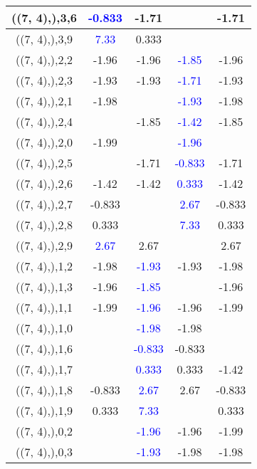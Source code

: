 \documentclass{article}
\begin{document}
\begin{center}
\begin{longtable}{|c|c|c|c|c|}
        	((7, 4),),3,6& \textcolor{blue}{-0.833}&-1.71&&-1.71\\
        	\hline
        	((7, 4),),3,9& \textcolor{blue}{7.33}&0.333&&\\
        	\hline
        	((7, 4),),2,2&-1.96&-1.96& \textcolor{blue}{-1.85}&-1.96\\
        	\hline
        	((7, 4),),2,3&-1.93&-1.93& \textcolor{blue}{-1.71}&-1.93\\
        	\hline
        	((7, 4),),2,1&-1.98&& \textcolor{blue}{-1.93}&-1.98\\
        	\hline
        	((7, 4),),2,4&&-1.85& \textcolor{blue}{-1.42}&-1.85\\
        	\hline
        	((7, 4),),2,0&-1.99&& \textcolor{blue}{-1.96}&\\
        	\hline
        	((7, 4),),2,5&&-1.71& \textcolor{blue}{-0.833}&-1.71\\
        	\hline
        	((7, 4),),2,6&-1.42&-1.42& \textcolor{blue}{0.333}&-1.42\\
        	\hline
        	((7, 4),),2,7&-0.833&& \textcolor{blue}{2.67}&-0.833\\
        	\hline
        	((7, 4),),2,8&0.333&& \textcolor{blue}{7.33}&0.333\\
        	\hline
        	((7, 4),),2,9& \textcolor{blue}{2.67}&2.67&&2.67\\
        	\hline
        	((7, 4),),1,2&-1.98& \textcolor{blue}{-1.93}&-1.93&-1.98\\
        	\hline
        	((7, 4),),1,3&-1.96& \textcolor{blue}{-1.85}&&-1.96\\
        	\hline
        	((7, 4),),1,1&-1.99& \textcolor{blue}{-1.96}&-1.96&-1.99\\
        	\hline
        	((7, 4),),1,0&& \textcolor{blue}{-1.98}&-1.98&\\
        	\hline
        	((7, 4),),1,6&& \textcolor{blue}{-0.833}&-0.833&\\
        	\hline
        	((7, 4),),1,7&& \textcolor{blue}{0.333}&0.333&-1.42\\
        	\hline
        	((7, 4),),1,8&-0.833& \textcolor{blue}{2.67}&2.67&-0.833\\
        	\hline
        	((7, 4),),1,9&0.333& \textcolor{blue}{7.33}&&0.333\\
        	\hline
        	((7, 4),),0,2&& \textcolor{blue}{-1.96}&-1.96&-1.99\\
        	\hline
        	((7, 4),),0,3&& \textcolor{blue}{-1.93}&-1.98&-1.98\\

\end{longtable}
\end{center}
\end{document}
